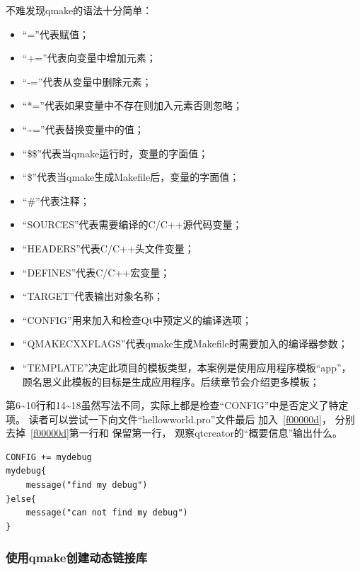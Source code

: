 不难发现qmake的语法十分简单：
\begin{itemize}
\item “=”代表赋值；
\item “+=”代表向变量中增加元素；
\item “-=”代表从变量中删除元素；
\item “*=”代表如果变量中不存在则加入元素否则忽略；
\item “\~{}=”代表替换变量中的值；
\item “\$\$”代表当qmake运行时，变量的字面值；
\item “\$”代表当qmake生成Makefile后，变量的字面值；
\item “\#”代表注释；
\item “SOURCES”代表需要编译的C/C++源代码变量；
\item “HEADERS”代表C/C++头文件变量；
\item “DEFINES”代表C/C++宏变量；
\item “TARGET”代表输出对象名称；
\item “CONFIG”用来加入和检查Qt中预定义的编译选项；
\item “QMAKE\underline{\hspace{0.5em}}CXXFLAGS”代表qmake生成Makefile时需要加入的编译器参数；
\item “TEMPLATE”决定此项目的模板类型，本案例是使用应用程序模板“app”，
顾名思义此模板的目标是生成应用程序。后续章节会介绍更多模板；
\end{itemize}

第6\~{}10行和14\~{}18虽然写法不同，实际上都是检查“CONFIG”中是否定义了特定项。
读者可以尝试一下向文件“hellow\underline{\hspace{0.5em}}world.pro”文件最后
加入\lstlistingname\ \ref{f00000d}，
分别去掉\lstlistingname\ \ref{f00000d}第一行和
保留第一行，
观察qtcreator的“概要信息”输出什么。
\begin{lstlisting}[label=f00000d,
caption=GoodLuck,
title=\lstlistingname\ \thelstlisting
]
CONFIG += mydebug
mydebug{
    message("find my debug")
}else{
    message("can not find my debug")
}
\end{lstlisting}          %




%
% 

\subsubsection{
使用qmake创建动态链接库
}\label{ss000710}


